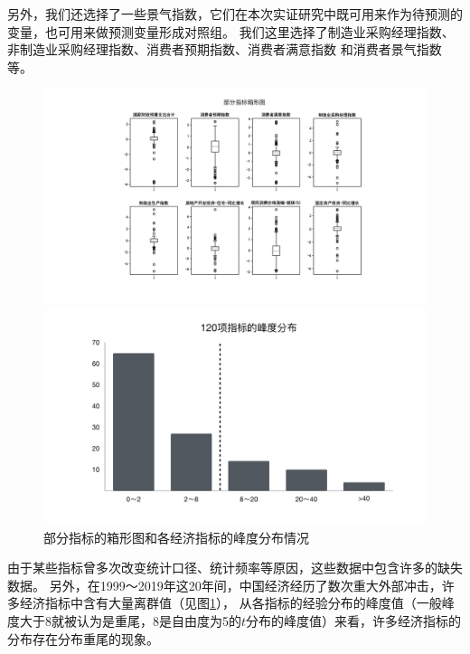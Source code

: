 另外，我们还选择了一些景气指数，它们在本次实证研究中既可用来作为待预测的变量，也可用来做预测变量形成对照组。
我们这里选择了制造业采购经理指数、非制造业采购经理指数、消费者预期指数、消费者满意指数
和消费者景气指数等。

\begin{figure}[H]
    \flushleft
    \begin{minipage}[t]{1\textwidth}
    \includegraphics[width=16cm]{pics/chapter2/box.pdf}
    \end{minipage}
    \begin{minipage}[t]{1\textwidth}
    \centering
    \includegraphics[width=12cm]{pics/chapter2/skew.pdf}
    \end{minipage}
    \caption{\small 部分指标的箱形图和各经济指标的峰度分布情况}
    \label{desc}
\end{figure}

由于某些指标曾多次改变统计口径、统计频率等原因，这些数据中包含许多的缺失数据。
另外，在1999～2019年这20年间，中国经济经历了数次重大外部冲击，许多经济指标中含有大量离群值（见图\ref{desc}），
从各指标的经验分布的峰度值（一般峰度大于8就被认为是重尾，8是自由度为5的$t$分布的峰度值）来看，许多经济指标的分布存在分布重尾的现象。

